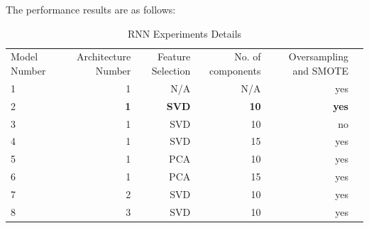 The performance results are as follows:

\begin{table}[!htp]\centering
\caption{RNN Experiments Details}\label{tab: }
\scriptsize
\begin{tabular}{lrrrrr}\toprule
Model Number &Architecture Number &Feature Selection &No. of components &Oversampling and SMOTE \\
1 &1 &N/A &N/A &yes \\\midrule
2 &\textbf{1} &\textbf{SVD} &\textbf{10} &\textbf{yes} \\
3 &1 &SVD &10 &no \\
4 &1 &SVD &15 &yes \\
5 &1 &PCA &10 &yes \\
6 &1 &PCA &15 &yes \\
7 &2 &SVD &10 &yes \\
8 &3 &SVD &10 &yes \\
\bottomrule
\end{tabular}
\end{table}

